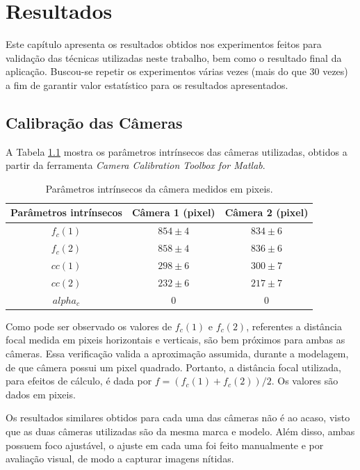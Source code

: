 \chapter{Resultados}

Este capítulo apresenta os resultados obtidos nos experimentos feitos para
validação das técnicas utilizadas neste trabalho, bem como o resultado final da
aplicação. Buscou-se repetir os experimentos várias vezes (mais do que 30 vezes)
a fim de garantir valor estatístico para os resultados apresentados.

\section{Calibração das Câmeras}

A Tabela \ref{tab:params_intrisecos} mostra os parâmetros intrínsecos das
câmeras utilizadas, obtidos a partir da ferramenta \textit{Camera Calibration
Toolbox for Matlab}.

\begin{table}[!htb]
\centering
\begin{tabular}{|c|c|c|}
\hline
Parâmetros intrínsecos & Câmera 1 (pixel) & Câmera 2 (pixel)\\ \hline
$f_c(1)$ & $854 \pm 4$ &  $834 \pm 6$ \\ \hline
$f_c(2)$ & $858 \pm 4$ & $836 \pm 6$ \\ \hline
$cc(1)$ & $298 \pm 6$ & $300 \pm 7$ \\ \hline
$cc(2)$ & $232 \pm 6$ & $217 \pm 7$ \\ \hline
$alpha_c$ & 0 & 0 \\ \hline
\end{tabular}

\caption{Parâmetros intrínsecos da câmera medidos em pixeis.}
\label{tab:params_intrisecos}
\end{table}

Como pode ser observado os valores de $f_c(1)$ e $f_c(2)$, referentes a
distância focal medida em pixeis horizontais e verticais, são bem próximos para
ambas as câmeras. Essa verificação valida a aproximação assumida, durante a
modelagem, de que câmera possui um pixel quadrado. Portanto, a distância focal
utilizada, para efeitos de cálculo, é dada por $f = (f_c(1) + f_c(2))/2$. Os
valores são dados em pixeis.

Os resultados similares obtidos para cada uma das câmeras não é ao acaso, visto
que as duas câmeras utilizadas são da mesma marca e modelo. Além disso, ambas
possuem foco ajustável, o ajuste em cada uma foi feito manualmente e por
avaliação visual, de modo a capturar imagens nítidas.

